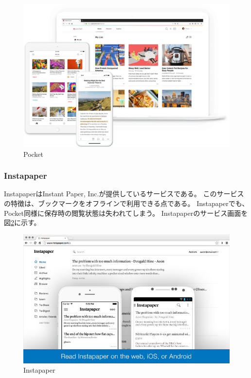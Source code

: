 \begin{figure}[htbp]
  \label{fig:pocket}
  \begin{center}
    \includegraphics[bb=0 0 545 378,width=15cm]{img/020_related_works/pocket.pdf}
  \end{center}
  \caption{Pocket}
\end{figure}

\subsubsection{Instapaper}
Instapaper\cite{instapaper}はInstant Paper, Inc.\cite{instant-paper-inc}が提供しているサービスである。
このサービスの特徴は、ブックマークをオフラインで利用できる点である。
Instapaperでも、Pocket同様に保存時の閲覧状態は失われてしまう。
Instapaperのサービス画面を図\ref{fig:instapaper}に示す。

\begin{figure}[htbp]
  \label{fig:instapaper}
  \begin{center}
    \includegraphics[bb=0 0 640 400,width=15cm]{img/020_related_works/instapaper.pdf}
  \end{center}
  \caption{Instapaper}
\end{figure}

